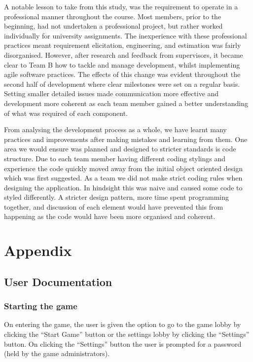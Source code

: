 \documentclass{l3proj}
\begin{document}
A notable lesson to take from this study, was the requirement to operate in a  professional manner throughout the course. Most members, prior to the beginning, had not undertaken a professional project, but rather worked individually for university assignments. The inexperience with these professional practices meant requirement elicitation, engineering, and estimation was fairly disorganised. However, after research and feedback from supervisors, it became clear to Team B how to tackle and manage development, whilst implementing agile software practices. The effects of this change was evident throughout the second half of development where clear milestones were set on a regular basis. Setting smaller detailed issues made communication more effective and development more coherent as each team member gained a better understanding of what was required of each component.

From analysing the development process as a whole, we have learnt many practices and improvements after making mistakes and learning from them. One area we would ensure was planned and designed to stricter standards is code structure. Due to each team member having different coding stylings and experience the code quickly moved away from the initial object oriented design which was first suggested. As a team we did not make strict coding rules when designing the application. In hindsight this was naive and caused some code to styled differently. A stricter design pattern, more time spent programming together, and discussion of each element would have prevented this from happening as the code would have been more organised and coherent.
\pagebreak
\section{Appendix}
\label{sec:appendix}

\subsection{User Documentation}
\subsubsection{Starting the game}
On entering the game, the user is given the option to go to the game lobby by clicking the “Start Game” button or the settings lobby by clicking the “Settings” button. On clicking the “Settings” button the user is prompted for a password (held by the game administrators).
\end{document}
